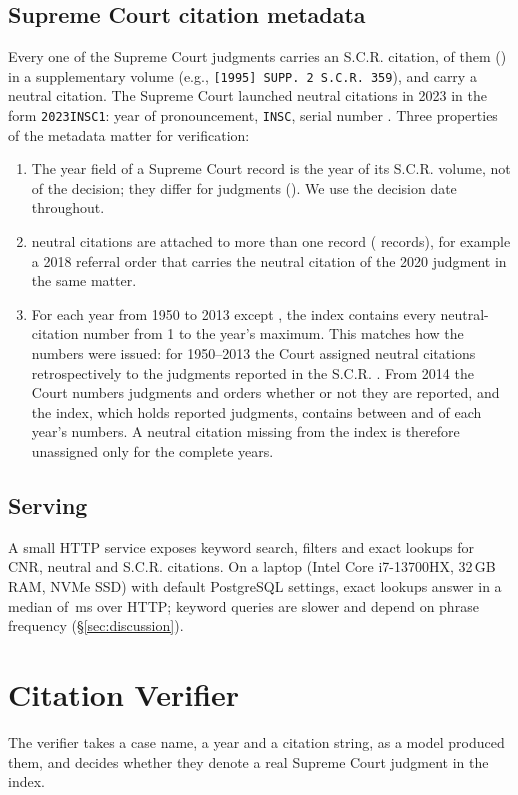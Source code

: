 \documentclass[conference]{IEEEtran}
\begin{document}
\subsection{Supreme Court citation metadata}
Every one of the \CorpusSC{} Supreme Court judgments carries an S.C.R. citation, \SCSupp{} of them (\SCSuppPct) in a supplementary volume (e.g., \texttt{[1995] SUPP.~2 S.C.R.~359}), and \SCwithNeutral{} carry a neutral citation. The Supreme Court launched neutral citations in 2023 in the form \texttt{2023INSC1}: year of pronouncement, \texttt{INSC}, serial number \cite{scneutral}. Three properties of the metadata matter for verification:
\begin{enumerate}
\item The year field of a Supreme Court record is the year of its S.C.R. volume, not of the decision; they differ for \SCYearNe{} judgments (\SCYearNePct). We use the decision date throughout.
\item \SCDupGroups{} neutral citations are attached to more than one record (\SCDupRows{} records), for example a 2018 referral order that carries the neutral citation of the 2020 judgment in the same matter.
\item For each year from 1950 to 2013 except \INSCIncompleteList, the index contains every neutral-citation number from 1 to the year's maximum. This matches how the numbers were issued: for 1950--2013 the Court assigned neutral citations retrospectively to the judgments reported in the S.C.R. \cite{scneutral2}. From 2014 the Court numbers judgments and orders whether or not they are reported, and the index, which holds reported judgments, contains between \INSCCovMin{} and \INSCCovMax{} of each year's numbers. A neutral citation missing from the index is therefore unassigned only for the \INSCCompleteCount{} complete years.
\end{enumerate}

\subsection{Serving}
A small HTTP service exposes keyword search, filters and exact lookups for CNR, neutral and S.C.R. citations. On a laptop (Intel Core i7-13700HX, 32\,GB RAM, NVMe SSD) with default PostgreSQL settings, exact lookups answer in a median of \LatExactMedian{}\,ms over HTTP; keyword queries are slower and depend on phrase frequency (\S\ref{sec:discussion}).

\section{Citation Verifier}
\label{sec:verifier}
The verifier takes a case name, a year and a citation string, as a model produced them, and decides whether they denote a real Supreme Court judgment in the index.
\end{document}
